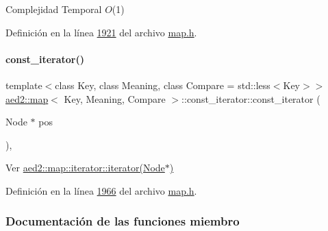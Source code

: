 \begin{DoxyDescription}
\item[Complejidad Temporal]$O$(1)
\end{DoxyDescription}

Definición en la línea \hyperlink{map_8h_source_l01921}{1921} del archivo \hyperlink{map_8h_source}{map.\+h}.

\mbox{\label{classaed2_1_1map_1_1const__iterator_a195d395708167dca23f9ce49f7c604f3_a195d395708167dca23f9ce49f7c604f3}} 
\paragraph{\texorpdfstring{const\+\_\+iterator()}{const\_iterator()}\hspace{0.1cm}{\footnotesize\ttfamily [3/3]}}
{\footnotesize\ttfamily template$<$class Key, class Meaning, class Compare = std\+::less$<$\+Key$>$$>$ \\
\hyperlink{classaed2_1_1map}{aed2\+::map}$<$ Key, Meaning, Compare $>$\+::const\+\_\+iterator\+::const\+\_\+iterator (\begin{DoxyParamCaption}\item[{Node $\ast$}]{pos }\end{DoxyParamCaption})\hspace{0.3cm}{\ttfamily [inline]}, {\ttfamily [private]}}



Ver \hyperlink{classaed2_1_1map_1_1iterator_ab0ea21abcb32b6d5a72cf341b9029838_ab0ea21abcb32b6d5a72cf341b9029838}{aed2\+::map\+::iterator\+::iterator(\+Node$\ast$)} 



Definición en la línea \hyperlink{map_8h_source_l01966}{1966} del archivo \hyperlink{map_8h_source}{map.\+h}.



\subsubsection{Documentación de las funciones miembro}
\mbox{\label{classaed2_1_1map_1_1const__iterator_a174e7b81e88253d936fb14512f00ef69_a174e7b81e88253d936fb14512f00ef69}} 
